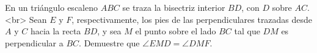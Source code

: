 En un triángulo escaleno $ABC$ se traza la bisectriz interior $BD$, con $D$ sobre $AC$.<br>
Sean $E$ y $F$, respectivamente, los pies de las perpendiculares trazadas desde $A$ y $C$ hacia la recta $BD$, y sea $M$ el punto sobre el lado $BC$ tal que $DM$ es perpendicular a $BC$. Demuestre que $\angle EMD = \angle DMF$.
